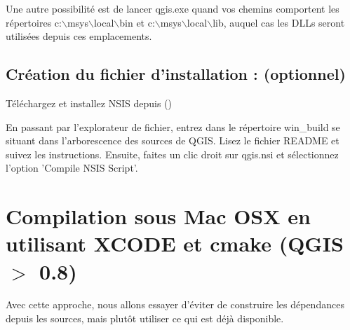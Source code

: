 Une autre possibilit\'e est de lancer qgis.exe quand vos chemins comportent les r\'epertoires c:$\backslash$msys$\backslash$local$\backslash$bin et c:$\backslash$msys$\backslash$local$\backslash$lib, auquel cas les DLLs seront utilis\'ees depuis ces emplacements.

% 

\subsection{Cr\'eation du fichier d'installation : (optionnel)}
T\'el\'echargez et installez NSIS depuis ()

En passant par l'explorateur de fichier, entrez dans le r\'epertoire win\_build se situant dans l'arborescence des sources de QGIS. Lisez le fichier README  et suivez les instructions. Ensuite, faites un clic droit sur qgis.nsi et s\'electionnez l'option 'Compile NSIS Script'. 

% 

\section{Compilation sous Mac OSX en utilisant XCODE et cmake (QGIS $>$
0.8)}\label{sec:install_macosx}

Avec cette approche, nous allons essayer d'\'eviter de construire les d\'ependances depuis les sources, mais plut\^ot utiliser ce qui est d\'ej\`a disponible.

